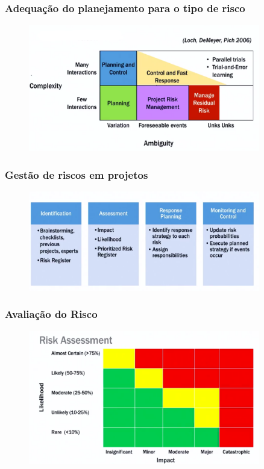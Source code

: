 \begin{frame}
 \frametitle{Adequação do planejamento para o tipo de risco}
  \begin{figure}
   \centering
   \includegraphics[width = 0.9\textwidth]{figs/fig5.png}
  \end{figure}
\end{frame}

\begin{frame}
 \frametitle{Gestão de riscos em projetos}
  \begin{figure}
   \centering
   \includegraphics[width = 0.9\textwidth]{figs/fig6.png}
  \end{figure}
\end{frame}

\begin{frame}
 \frametitle{Avaliação do Risco}
  \begin{figure}
   \centering
   \includegraphics[width = 0.9\textwidth]{figs/fig7.png}
  \end{figure}
\end{frame}

